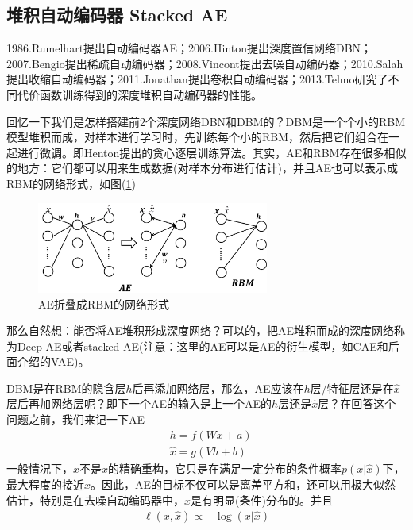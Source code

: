     \subsection{堆积自动编码器 Stacked AE}
        \par
        1986.Rumelhart提出自动编码器AE；2006.Hinton提出深度置信网络DBN；2007.Bengio提出稀疏自动编码器；2008.Vincont提出去噪自动编码器；2010.Salah提出收缩自动编码器；2011.Jonathan提出卷积自动编码器；2013.Telmo研究了不同代价函数训练得到的深度堆积自动编码器的性能。
        \par
        回忆一下我们是怎样搭建前2个深度网络DBN和DBM的？DBM是一个个小的RBM模型堆积而成，对样本进行学习时，先训练每个小的RBM，然后把它们组合在一起进行微调。即Henton提出的贪心逐层训练算法。其实，AE和RBM存在很多相似的地方：它们都可以用来生成数据(对样本分布进行估计)，并且AE也可以表示成RBM的网络形式，如图(\ref{fig:AE折叠成RBM的网络形式})
            \begin{figure}[H]
            \centering
            \includegraphics[height=3cm]{images/AE_fold_into_RMB_net.jpg}
            \caption{AE折叠成RBM的网络形式}
            \label{fig:AE折叠成RBM的网络形式}
            \end{figure}
        那么自然想：能否将AE堆积形成深度网络？可以的，把AE堆积而成的深度网络称为Deep AE或者stacked AE(注意：这里的AE可以是AE的衍生模型，如CAE和后面介绍的VAE)。
        \par
        DBM是在RBM的隐含层$h$后再添加网络层，那么，AE应该在$h$层/特征层还是在$\hat{x}$层后再加网络层呢？即下一个AE的输入是上一个AE的$h$层还是$\hat{x}$层？在回答这个问题之前，我们来记一下AE
        \begin{align*}
        & h = f(Wx+a)\\
        & \hat{x} = g(Vh+b)
        \end{align*}
        一般情况下，$\hat{x}$不是$x$的精确重构，它只是在满足一定分布的条件概率$p(x|\hat{x})$下，最大程度的接近$x$。因此，AE的目标不仅可以是离差平方和，还可以用极大似然估计，特别是在去噪自动编码器中，$\hat{x}$是有明显(条件)分布的。并且
        \begin{align*}
        \ell (x,\hat{x}) \propto -\log (x|\hat{x})
        \end{align*}
